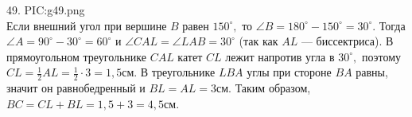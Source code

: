 49. {{PIC:g49.png}}\\
Если внешний угол при вершине $B$ равен $150^\circ,$ то $\angle B=180^\circ-150^\circ=30^\circ.$ Тогда $\angle A=90^\circ-30^\circ=60^\circ$ и $\angle CAL=\angle LAB=30^\circ$ (так как $AL$ --- биссектриса). В прямоугольном треугольнике $CAL$ катет $CL$ лежит напротив угла в $30^\circ,$ поэтому $CL=\frac{1}{2}AL=\frac{1}{2}\cdot3=1,5$см. В треугольнике $LBA$ углы при стороне $BA$ равны, значит он равнобедренный и $BL=AL=3$см. Таким образом, $BC=CL+BL=1,5+3=4,5$см.\\
